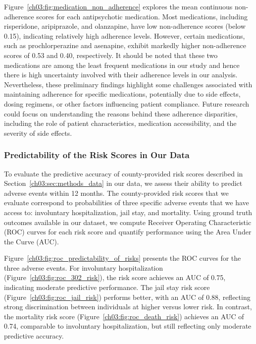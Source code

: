 Figure~\ref{ch03:fig:medication_non_adherence} explores the mean continuous non-adherence scores for each antipsychotic medication. 
Most medications, including risperidone, aripiprazole, and olanzapine, have low non-adherence scores (below 0.15), indicating relatively high adherence levels. 
However, certain medications, such as prochlorperazine and asenapine, exhibit markedly higher non-adherence scores of 0.53 and 0.40, respectively. 
It should be noted that these two medications are among the least frequent medications in our study and hence there is high uncertainty involved with their adherence levels in our analysis. 
Nevertheless, these preliminary findings highlight some challenges associated with maintaining adherence for specific medications, potentially due to side effects, dosing regimens, or other factors influencing patient compliance. 
Future research could focus on understanding the reasons behind these adherence disparities, including the role of patient characteristics, medication accessibility, and the severity of side effects. 


\subsubsection{Predictability of the Risk Scores in Our Data}
\label{ch03:apd:risk_score_evaluations}






To evaluate the predictive accuracy of county-provided risk scores described in Section~\ref{ch03:sec:methods_data} in our data, we assess their ability to predict adverse events within 12 months.
The county-provided risk scores that we evaluate correspond to probabilities of three specific adverse events that we have access to: involuntary hospitalization, jail stay, and mortality.
Using ground truth outcomes available in our dataset, we compute Receiver Operating Characteristic (ROC) curves for each risk score and quantify performance using the Area Under the Curve (AUC).

Figure~\ref{ch03:fig:roc_predictability_of_risks} presents the ROC curves for the three adverse events.
For involuntary hospitalization (Figure~\ref{ch03:fig:roc_302_risk}), the risk score achieves an AUC of 0.75, indicating moderate predictive performance.
The jail stay risk score (Figure~\ref{ch03:fig:roc_jail_risk}) performs better, with an AUC of 0.88, reflecting strong discrimination between individuals at higher versus lower risk.
In contrast, the mortality risk score (Figure~\ref{ch03:fig:roc_death_risk}) achieves an AUC of 0.74, comparable to involuntary hospitalization, but still reflecting only moderate predictive accuracy.

